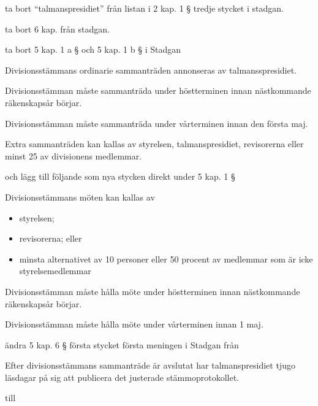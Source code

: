 \documentclass[protokoll]{dvd}
\begin{document}
\begin{attsatser}
	\item ta bort ``talmanspresidiet'' från listan i 2 kap. 1 § tredje stycket i stadgan.

	\item ta bort 6 kap. från stadgan.

	\item ta bort 5 kap. 1 a § och 5 kap. 1 b § i Stadgan

	\begin{displayquote}
		Divisionsstämmans ordinarie sammanträden annonseras av talmansspresidiet.

		Divisionsstämman måste sammanträda under höstterminen innan nästkommande räkenskapsår börjar.

		Divisionsstämman måste sammanträda under vårterminen innan den första maj.

		Extra sammanträden kan kallas av styrelsen, talmanspresidiet, revisorerna eller minst 25 av divisionens medlemmar.
	\end{displayquote}

	och lägg till följande som nya stycken direkt under 5 kap. 1 §

	\begin{displayquote}
		Divisionsstämmans möten kan kallas av

		\begin{itemize}
			\item styrelsen;
			\item revisorerna; eller
			\item minsta alternativet av 10 personer eller 50 procent av medlemmar som är icke styrelsemedlemmar
		\end{itemize}

		Divisionsstämman måste hålla möte under höstterminen innan nästkommande räkenskapsår börjar.

		Divisionsstämman måste hålla möte under vårterminen innan 1 maj.
	\end{displayquote}

	\item ändra 5 kap. 6 § första stycket första meningen i Stadgan från

	\begin{displayquote}
		Efter divisionsstämmans sammanträde är avslutat har talmanspresidiet tjugo läsdagar på sig att publicera det justerade stämmoprotokollet.
	\end{displayquote}

	till


\end{attsatser}
\end{document}
